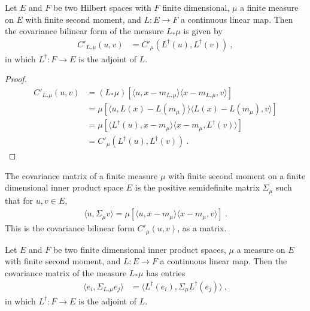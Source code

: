 \begin{lemma}\label{lem:covInnerBilin_map}
  \mathlibok
Let $E$ and $F$ be two Hilbert spaces with $F$ finite dimensional, $\mu$ a finite measure on $E$ with finite second moment, and $L : E \to F$ a continuous linear map.
Then the covariance bilinear form of the measure $L_*\mu$ is given by
\begin{align*}
  C'_{L_*\mu}(u, v)
  &= C'_\mu(L^\dagger(u), L^\dagger(v))
  \: ,
\end{align*}
in which $L^\dagger : F \to E$ is the adjoint of $L$.
\end{lemma}

\begin{proof}\leanok
\begin{align*}
  C'_{L_*\mu}(u, v)
  &= (L_*\mu)\left[\langle u, x - m_{L_*\mu}\rangle \langle x - m_{L_*\mu}, v \rangle\right]
  \\
  &= \mu\left[\langle u, L(x) - L(m_\mu)\rangle \langle L(x) - L(m_\mu), v \rangle \right]
  \\
  &= \mu\left[\langle L^\dagger(u), x - m_\mu\rangle \langle x - m_\mu, L^\dagger(v) \rangle \right]
  \\
  &= C'_\mu(L^\dagger(u), L^\dagger(v))
  \: .
\end{align*}
\end{proof}


\begin{definition}\label{def:covMatrix}
  \leanok
The covariance matrix of a finite measure $\mu$ with finite second moment on a finite dimensional inner product space $E$ is the positive semidefinite matrix $\Sigma_\mu$ such that for $u, v \in E$,
\begin{align*}
  \langle u, \Sigma_\mu v\rangle = \mu[\langle u, x - m_\mu \rangle \langle x - m_\mu, v \rangle] \: .
\end{align*}
This is the covariance bilinear form $C'_\mu(u, v)$, as a matrix.
\end{definition}


\begin{lemma}\label{lem:covMatrix_map}
  \leanok
Let $E$ and $F$ be two finite dimensional inner product spaces, $\mu$ a measure on $E$ with finite second moment, and $L : E \to F$ a continuous linear map.
Then the covariance matrix of the measure $L_*\mu$ has entries
\begin{align*}
  \langle e_i, \Sigma_{L_*\mu} e_j\rangle
  &= \langle L^\dagger(e_i), \Sigma_\mu L^\dagger(e_j)\rangle
  \: ,
\end{align*}
in which $L^\dagger : F \to E$ is the adjoint of $L$.
\end{lemma}

